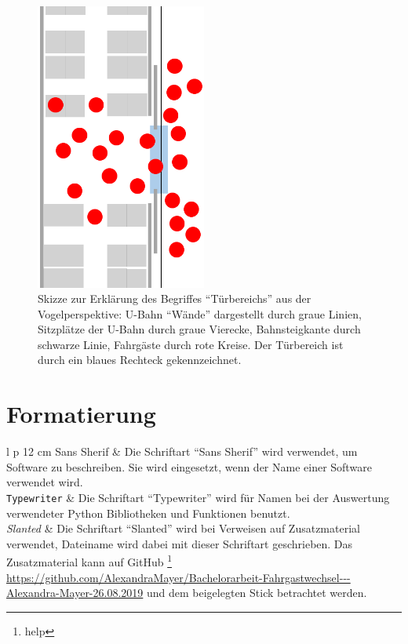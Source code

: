  \begin{figure}[H]
	\centering
		\includegraphics[angle=270, width=0.5\textwidth]{pictures/introduction/defenitions/example_doorarea.png}
	\caption{Skizze zur Erklärung des Begriffes "`Türbereichs"' aus der Vogelperspektive: U-Bahn "`Wände"' dargestellt durch graue Linien, Sitzplätze der U-Bahn durch graue Vierecke, Bahnsteigkante durch schwarze Linie, Fahrgäste durch rote Kreise. Der Türbereich ist durch ein blaues Rechteck gekennzeichnet.}
	\label{fig:Doorarea}
\end{figure} 
\section{Formatierung}
\begin{table}[H]
	\centering
		\begin{tabular}{ l p {12 cm}}
		\textsf{Sans Sherif}	& Die Schriftart "`Sans Sherif"' wird verwendet, um Software zu beschreiben. Sie wird eingesetzt, wenn der Name einer Software verwendet wird.\\
		\texttt{Typewriter}	& Die Schriftart "`Typewriter"' wird für Namen bei der Auswertung verwendeter Python Bibliotheken und Funktionen benutzt. \\
		\textsl{Slanted}	& Die Schriftart "`Slanted"' wird bei Verweisen auf Zusatzmaterial verwendet, Dateiname wird dabei mit dieser Schriftart geschrieben. Das Zusatzmaterial kann auf GitHub \footnote{help} \url{https://github.com/AlexandraMayer/Bachelorarbeit-Fahrgastwechsel---Alexandra-Mayer-26.08.2019} und dem beigelegten Stick betrachtet werden.
		\end{tabular}
\end{table}